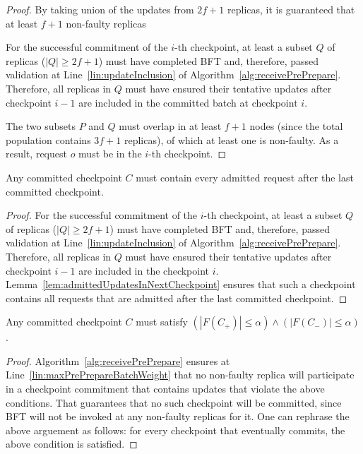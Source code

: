 \documentclass[twocolumn,10pt]{article}
\begin{document}
{\begin{proof}
By taking union of the updates from $2f+1$ replicas, it is guaranteed that at
least $f+1$ non-faulty replicas 


For the successful commitment of the $i$-th checkpoint, at least a
subset $Q$ of replicas ($|Q| \geq 2f+1$)
must have completed BFT and, therefore, passed validation at
Line~\ref{lin:updateInclusion} of
Algorithm~\ref{alg:receivePrePrepare}. Therefore, all replicas in $Q$
must have ensured their tentative updates after checkpoint
$i-1$ are included in the committed batch at checkpoint $i$.

The two subsets $P$ and $Q$ must overlap in at least $f+1$ nodes (since
the total population contains $3f+1$ replicas), of which at least one is
non-faulty. As a result, request $o$ must be in the $i$-th checkpoint.
\fi
\end{proof}

\begin{lemma}
\label{lem:admittedCheckpoint}
Any committed checkpoint $C$ must contain every admitted request after the last
committed checkpoint.
\end{lemma}
\begin{proof}
For the successful commitment of the $i$-th checkpoint, at least a
subset $Q$ of replicas ($|Q| \geq 2f+1$)
must have completed BFT and, therefore, passed validation at
Line~\ref{lin:updateInclusion} of
Algorithm~\ref{alg:receivePrePrepare}. Therefore, all replicas in $Q$
must have ensured their tentative updates after checkpoint
$i-1$ are included in the checkpoint $i$.
Lemma~\ref{lem:admittedUpdatesInNextCheckpoint} ensures that such a checkpoint
contains all requests that are admitted after the last committed checkpoint.
\end{proof}


\begin{lemma}
\label{lem:maxCheckpointWeight}
Any committed checkpoint $C$ must satisfy $(|F(C_+)| \leq \alpha) \wedge
(|F(C_-)| \leq \alpha)$.
\end{lemma}
\begin{proof}
Algorithm~\ref{alg:receivePrePrepare} ensures at
Line~\ref{lin:maxPrePrepareBatchWeight} that no non-faulty replica will
participate in a checkpoint commitment that contains updates that
violate the above conditions. That guarantees that no such checkpoint
will be committed, since BFT will not be invoked at any non-faulty
replicas for it. One can rephrase the above arguement as follows: for every
checkpoint that eventually commits, the above condition is satisfied.
\end{proof}

}
\end{document}
